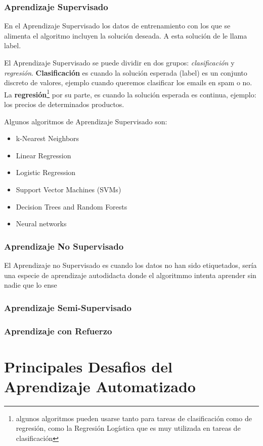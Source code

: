 \documentclass[10pt,a4paper]{book}
\begin{document}
\subsubsection{Aprendizaje Supervisado}

En el Aprendizaje Supervisado los datos de entrenamiento con los que se alimenta el algoritmo incluyen la soluci\'on deseada.  A esta soluci\'on de le llama label.

El Aprendizaje Supervisado se puede dividir en dos grupos: \textit{clasificaci\'on} y \textit{regresi\'on}.  \textbf{Clasificaci\'on} es cuando la soluci\'on esperada (label) es un conjunto discreto de valores,  ejemplo cuando queremos clasificar los emails en spam o no.  La \textbf{regresi\'on}\footnote{algunos algoritmos pueden usarse tanto para tareas de clasificaci\'on como de regresi\'on, como la Regresi\'on Log\'istica que es muy utilizada en tareas de clasificaci\'on} por su parte,  es cuando la soluci\'on esperada es continua,  ejemplo: los precios de determinados productos.

Algunos algoritmos de Aprendizaje Supervisado son:
\begin{itemize}
\item k-Nearest Neighbors
\item Linear Regression
\item Logistic Regression
\item Support Vector Machines (SVMs) 
\item Decision Trees and Random Forests 
\item Neural networks
\end{itemize}

\subsubsection{Aprendizaje No Supervisado}

El Aprendizaje no Supervisado es cuando los datos no han sido etiquetados,  ser\'ia una especie de aprendizaje autodidacta donde el algoritmmo intenta aprender sin nadie que lo ense

\subsubsection{Aprendizaje Semi-Supervisado}

\subsubsection{Aprendizaje con Refuerzo}

\section{Principales Desafios del Aprendizaje Automatizado}
\end{document}

